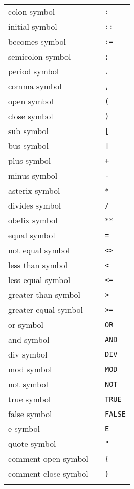 \documentclass [a4paper,12pt,fleqn]{article}
\begin{document}
\begin{center}
\begin{tabular}{lll}
colon symbol & & \verb+:+\\
initial symbol & & \verb+::+\\
becomes symbol & & \verb+:=+\\
semicolon symbol & & \verb+;+\\
period symbol & & \verb+.+\\
comma symbol & & \verb+,+\\
open symbol & & \verb+(+\\
close symbol & & \verb+)+\\
sub symbol & & \verb+[+\\
bus symbol & & \verb+]+\\
plus symbol & & \verb-+-\\
minus symbol & & \verb+-+\\
asterix symbol & & \verb+*+\\
divides symbol & & \verb+/+\\
obelix symbol & & \verb+**+\\
equal symbol & & \verb+=+\\
not equal symbol & & \verb+<>+\\
less than symbol & & \verb+<+\\
less equal symbol & & \verb+<=+\\
greater than symbol & & \verb+>+\\
greater equal symbol & & \verb+>=+\\
or symbol & & \verb+OR+\\
and symbol & & \verb+AND+\\
div symbol & & \verb+DIV+\\
mod symbol & & \verb+MOD+\\
not symbol & & \verb+NOT+\\
true symbol & & \verb+TRUE+\\
false symbol & & \verb+FALSE+\\
e symbol & & \verb+E+\\
quote symbol & & \verb+"+\\
comment open symbol & & \verb+{+\\
comment close symbol & & \verb+}+\\
\hspace*{8em} & \hspace*{2em} & \hspace*{8em}
\end {tabular}
\end {center}
\end{document}
